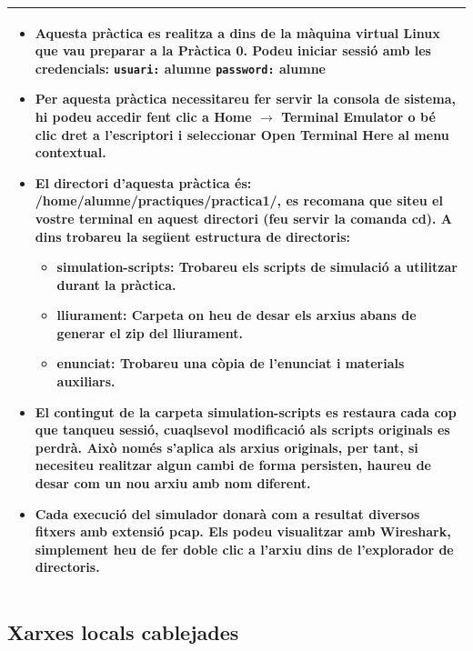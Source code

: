\documentclass[12pt,a4paper]{article}
\begin{document}
 \begin{tabular}{||p{12cm}||}
 \hline\hline
 \begin{itemize}
 \item Aquesta pràctica es realitza a dins de la màquina virtual Linux que vau preparar a la Pràctica 0. Podeu iniciar sessió amb les credencials: 
   \newline \texttt{usuari:} \textbf{alumne}
   \newline \texttt{password:} \textbf{alumne}
 \item Per aquesta pràctica necessitareu fer servir la consola de sistema, hi podeu accedir fent clic a \textbf{Home} $\rightarrow$ \textbf{Terminal Emulator} o bé clic dret a l'escriptori i seleccionar \textbf{Open Terminal Here} al menu contextual.
 
 \item El directori d'aquesta pràctica és: \textbf{/home/alumne/practiques/practica1/}, es recomana que siteu el vostre terminal en aquest directori (feu servir la comanda \textbf{cd}). A dins trobareu la següent estructura de directoris:
    \begin{itemize}        
        \item\textbf{simulation-scripts}: Trobareu els scripts de simulació a utilitzar durant la pràctica.
        \item\textbf{lliurament}: Carpeta on heu de desar els arxius abans de generar el zip del lliurament.
        \item\textbf{enunciat}: Trobareu una còpia de l'enunciat i materials auxiliars.
    \end{itemize}
 
 \item El contingut de la carpeta \textbf{simulation-scripts} es restaura cada cop que tanqueu sessió, cuaqlsevol modificació als scripts originals es perdrà. Això només s'aplica als arxius originals, per tant, si necesiteu realitzar algun cambi de forma persisten, haureu de desar com un nou arxiu amb nom diferent.
 
 \item Cada execució del simulador donarà com a resultat diversos fitxers amb extensió \textbf{pcap}. Els podeu visualitzar amb \textbf{Wireshark}, simplement heu de fer doble clic a l'arxiu dins de l'explorador de directoris.  
 \end{itemize}
 \\\hline\hline
 \end{tabular}
 \medskip
 
\subsection{Xarxes locals cablejades}
\end{document}
